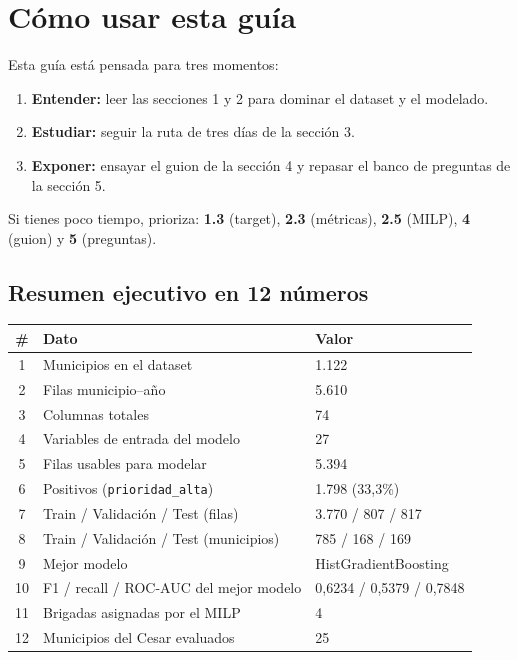 \documentclass[11pt,a4paper]{article}
\newcommand{\code}[1]{\texttt{#1}}
\begin{document}
\begingroup
\small
\tableofcontents
\endgroup
\newpage

\section{Cómo usar esta guía}

Esta guía está pensada para tres momentos:

\begin{enumerate}[leftmargin=*]
  \item \textbf{Entender:} leer las secciones 1 y 2 para dominar el dataset y el modelado.
  \item \textbf{Estudiar:} seguir la ruta de tres días de la sección 3.
  \item \textbf{Exponer:} ensayar el guion de la sección 4 y repasar el banco de preguntas de la sección 5.
\end{enumerate}

Si tienes poco tiempo, prioriza: \textbf{1.3} (target), \textbf{2.3} (métricas), \textbf{2.5} (MILP), \textbf{4} (guion) y \textbf{5} (preguntas).

\subsection{Resumen ejecutivo en 12 números}

\begin{table}[H]
\centering
\small
\begin{tabularx}{\textwidth}{@{}c L{7.2cm} Y@{}}
\toprule
\textbf{\#} & \textbf{Dato} & \textbf{Valor} \\
 & Municipios en el dataset & 1.122 \\
2 & Filas municipio--año & 5.610 \\
3 & Columnas totales & 74 \\
4 & Variables de entrada del modelo & 27 \\
5 & Filas usables para modelar & 5.394 \\
6 & Positivos (\code{prioridad_alta}) & 1.798 (33,3\%) \\
7 & Train / Validación / Test (filas) & 3.770 / 807 / 817 \\
8 & Train / Validación / Test (municipios) & 785 / 168 / 169 \\
9 & Mejor modelo & HistGradientBoosting \\
10 & F1 / recall / ROC-AUC del mejor modelo & 0,6234 / 0,5379 / 0,7848 \\
11 & Brigadas asignadas por el MILP & 4 \\
12 & Municipios del Cesar evaluados & 25 \\
\bottomrule
\end{tabularx}
\end{table}
\end{document}
